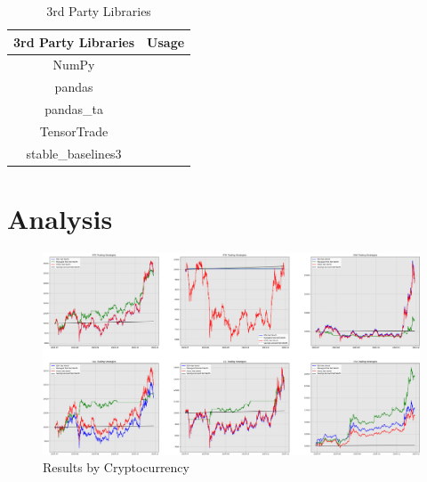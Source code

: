 \documentclass[journal]{new-aiaa}
\begin{document}
\begin{table}[hbt!]
        \centering
        \begin{tabular}{|c|c|}
                \hline
                \textbf{3rd Party Libraries} & \textbf{Usage} \\
                \hline
                \hline
                NumPy \cite{harris2020array} & \\
                \hline
                pandas \cite{reback2020pandas} & \\
                \hline
                pandas\_ta \cite{pandas-ta} & \\
                \hline
                TensorTrade \cite{Tensortrade} & \\
                \hline
                stable\_baselines3 \cite{stable-baselines3} & \\
                \hline
        \end{tabular}
        \caption{3rd Party Libraries}
        \label{tab:3rd_Party_Libraries}
\end{table}

\section{Analysis}\label{sec:Analysis}

\begin{figure}[hbt!]
        \centering
        \includegraphics[width=\textwidth]{figures/model_results_per_asset.png}
        \caption{Results by Cryptocurrency}
        \label{fig:Aggregate Results}
\end{figure}
\end{document}
